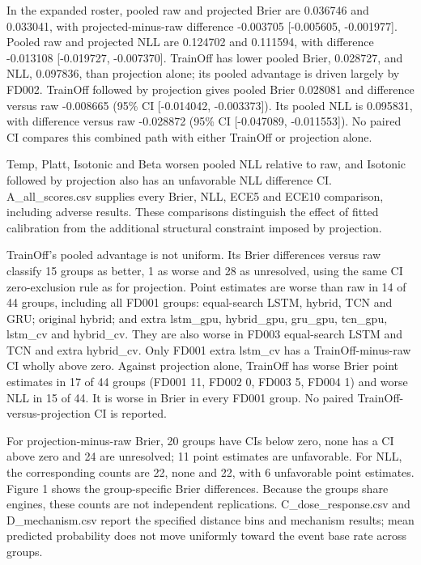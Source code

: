 \documentclass[IJPHM, 2026, 0]{phmsociety}
\begin{document}
In the expanded roster, pooled raw and projected Brier are \mbox{0.036746} and \mbox{0.033041}, with projected-minus-raw difference \mbox{-0.003705} {[}\mbox{-0.005605}, \mbox{-0.001977}{]}. Pooled raw and projected NLL are \mbox{0.124702} and \mbox{0.111594}, with difference \mbox{-0.013108} {[}\mbox{-0.019727}, \mbox{-0.007370}{]}. TrainOff has lower pooled Brier, \mbox{0.028727}, and NLL, \mbox{0.097836}, than projection alone; its pooled advantage is driven largely by FD002. TrainOff followed by projection gives pooled Brier \mbox{0.028081} and difference versus raw \mbox{-0.008665} (\mbox{95}\% CI {[}\mbox{-0.014042}, \mbox{-0.003373}{]}). Its pooled NLL is \mbox{0.095831}, with difference versus raw \mbox{-0.028872} (\mbox{95}\% CI {[}\mbox{-0.047089}, \mbox{-0.011553}{]}). No paired CI compares this combined path with either TrainOff or projection alone.

Temp, Platt, Isotonic and Beta worsen pooled NLL relative to raw, and Isotonic followed by projection also has an unfavorable NLL difference CI. A\_\allowbreak{}all\_\allowbreak{}scores.csv supplies every Brier, NLL, ECE5 and ECE10 comparison, including adverse results. These comparisons distinguish the effect of fitted calibration from the additional structural constraint imposed by projection.

TrainOff's pooled advantage is not uniform. Its Brier differences versus raw classify \mbox{15} groups as better, \mbox{1} as worse and \mbox{28} as unresolved, using the same CI zero-exclusion rule as for projection. Point estimates are worse than raw in \mbox{14} of \mbox{44} groups, including all FD001 groups: equal-search LSTM, hybrid, TCN and GRU; original hybrid; and extra lstm\_\allowbreak{}gpu, hybrid\_\allowbreak{}gpu, gru\_\allowbreak{}gpu, tcn\_\allowbreak{}gpu, lstm\_\allowbreak{}cv and hybrid\_\allowbreak{}cv. They are also worse in FD003 equal-search LSTM and TCN and extra hybrid\_\allowbreak{}cv. Only FD001 extra lstm\_\allowbreak{}cv has a TrainOff-minus-raw CI wholly above zero. Against projection alone, TrainOff has worse Brier point estimates in \mbox{17} of \mbox{44} groups (FD001 \mbox{11}, FD002 \mbox{0}, FD003 \mbox{5}, FD004 \mbox{1}) and worse NLL in \mbox{15} of 44. It is worse in Brier in every FD001 group. No paired TrainOff-versus-projection CI is reported.

For projection-minus-raw Brier, \mbox{20} groups have CIs below zero, none has a CI above zero and \mbox{24} are unresolved; \mbox{11} point estimates are unfavorable. For NLL, the corresponding counts are \mbox{22}, none and \mbox{22}, with \mbox{6} unfavorable point estimates. Figure \mbox{1} shows the group-specific Brier differences. Because the groups share engines, these counts are not independent replications. C\_\allowbreak{}dose\_\allowbreak{}response.csv and D\_\allowbreak{}mechanism.csv report the specified distance bins and mechanism results; mean predicted probability does not move uniformly toward the event base rate across groups.
\end{document}
